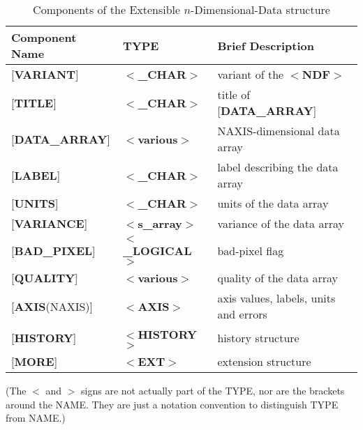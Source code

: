 \documentclass[twoside,11pt,nolof,noabs]{starlink}
\begin{document}
\begin{table}
\centering
\caption{Components of the Extensible $n$-Dimensional-Data
structure}
\label{ta:example1}
\begin{tabular}{|l|l|l|}
\hline
Component Name & TYPE & Brief Description \\ \hline
{[}\textbf{VARIANT}{]} & $<$\textbf{\_CHAR}$>$ & variant of the $<$\textbf{NDF}$>$ \\
{[}\textbf{TITLE}{]} & $<$\textbf{\_CHAR}$>$ & title of {[}\textbf{DATA\_ARRAY}{]} \\
{[}\textbf{DATA\_ARRAY}{]} & $<$\textbf{various}$>$ & NAXIS-dimensional data array \\
{[}\textbf{LABEL}{]} & $<$\textbf{\_CHAR}$>$ & label describing the data array \\
{[}\textbf{UNITS}{]} & $<$\textbf{\_CHAR}$>$ & units of the data array \\
{[}\textbf{VARIANCE}{]} & $<$\textbf{s\_array}$>$ & variance of the data array \\
{[}\textbf{BAD\_PIXEL}{]} & $<$\textbf{\_LOGICAL}$>$ & bad-pixel flag \\
{[}\textbf{QUALITY}{]} & $<$\textbf{various}$>$ & quality of the data array \\
{[}\textbf{AXIS}(NAXIS){]} & $<$\textbf{AXIS}$>$ & axis values, labels, units and errors \\
{[}\textbf{HISTORY}{]} & $<$\textbf{HISTORY}$>$ & history structure \\
{[}\textbf{MORE}{]} & $<$\textbf{EXT}$>$ & extension structure \\ \hline
\end{tabular}
\end{table}

(The $<$ and $>$ signs
are not actually part of the TYPE,
nor are the brackets around the NAME.  They are
just a notation convention
to distinguish TYPE from NAME.)
\end{document}
